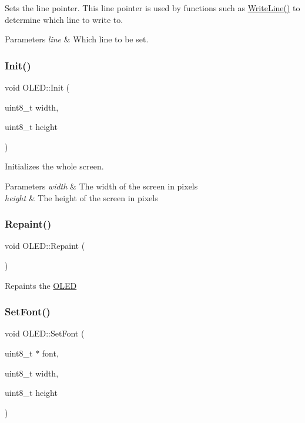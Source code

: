 Sets the line pointer. This line pointer is used by functions such as \hyperlink{class_o_l_e_d_a0ffccb4fd874b997c869c5d511f76df8}{Write\+Line()} to determine which line to write to. 
\begin{DoxyParams}{Parameters}
{\em line} & Which line to be set. \\
\hline
\end{DoxyParams}
\hypertarget{class_o_l_e_d_a2c8205c8eac9d7a2b181657561e9b4d2}{}\label{class_o_l_e_d_a2c8205c8eac9d7a2b181657561e9b4d2} 
\subsubsection{\texorpdfstring{Init()}{Init()}}
{\footnotesize\ttfamily void O\+L\+E\+D\+::\+Init (\begin{DoxyParamCaption}\item[{uint8\+\_\+t}]{width,  }\item[{uint8\+\_\+t}]{height }\end{DoxyParamCaption})}

Initializes the whole screen. 
\begin{DoxyParams}{Parameters}
{\em width} & The width of the screen in pixels \\
\hline
{\em height} & The height of the screen in pixels \\
\hline
\end{DoxyParams}
\hypertarget{class_o_l_e_d_a3efa34861b4ae0bc5323f6b7cf1d8a01}{}\label{class_o_l_e_d_a3efa34861b4ae0bc5323f6b7cf1d8a01} 
\subsubsection{\texorpdfstring{Repaint()}{Repaint()}}
{\footnotesize\ttfamily void O\+L\+E\+D\+::\+Repaint (\begin{DoxyParamCaption}{ }\end{DoxyParamCaption})}

Repaints the \hyperlink{class_o_l_e_d}{O\+L\+ED} \hypertarget{class_o_l_e_d_abe6073c961cadc4c9b693eb8dc8198bd}{}\label{class_o_l_e_d_abe6073c961cadc4c9b693eb8dc8198bd} 
\subsubsection{\texorpdfstring{Set\+Font()}{SetFont()}}
{\footnotesize\ttfamily void O\+L\+E\+D\+::\+Set\+Font (\begin{DoxyParamCaption}\item[{uint8\+\_\+t $\ast$}]{font,  }\item[{uint8\+\_\+t}]{width,  }\item[{uint8\+\_\+t}]{height }\end{DoxyParamCaption})}


